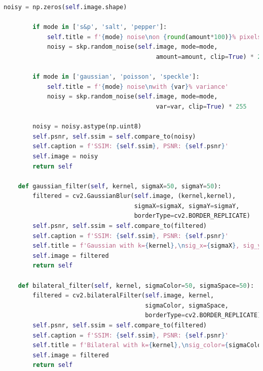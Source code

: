 \documentclass[a4paper, english]{article}
\begin{document}
\begin{lstlisting}[language=Python, caption=Class to streamline the experimentation process, label=experimentation_code]
        noisy = np.zeros(self.image.shape)

        if mode in ['s&p', 'salt', 'pepper']:
            self.title = f'{mode} noise\non {round(amount*100)}% pixels'
            noisy = skp.random_noise(self.image, mode=mode,
                                          amount=amount, clip=True) * 255

        if mode in ['gaussian', 'poisson', 'speckle']:
            self.title = f'{mode} noise\nwith {var}% variance'
            noisy = skp.random_noise(self.image, mode=mode,
                                          var=var, clip=True) * 255

        noisy = noisy.astype(np.uint8)
        self.psnr, self.ssim = self.compare_to(noisy)
        self.caption = f'SSIM: {self.ssim}, PSNR: {self.psnr}'
        self.image = noisy
        return self

    def gaussian_filter(self, kernel, sigmaX=50, sigmaY=50):
        filtered = cv2.GaussianBlur(self.image, (kernel,kernel),
                                    sigmaX=sigmaX, sigmaY=sigmaY,
                                    borderType=cv2.BORDER_REPLICATE)
        self.psnr, self.ssim = self.compare_to(filtered)
        self.caption = f'SSIM: {self.ssim}, PSNR: {self.psnr}'
        self.title = f'Gaussian with k={kernel},\nsig_x={sigmaX}, sig_y={sigmaY}'
        self.image = filtered
        return self

    def bilateral_filter(self, kernel, sigmaColor=50, sigmaSpace=50):
        filtered = cv2.bilateralFilter(self.image, kernel,
                                       sigmaColor, sigmaSpace,
                                       borderType=cv2.BORDER_REPLICATE)
        self.psnr, self.ssim = self.compare_to(filtered)
        self.caption = f'SSIM: {self.ssim}, PSNR: {self.psnr}'
        self.title = f'Bilateral with k={kernel},\nsig_color={sigmaColor}, sig_dist={sigmaSpace}'
        self.image = filtered
        return self

\end{lstlisting}

\newpage
\end{document}
